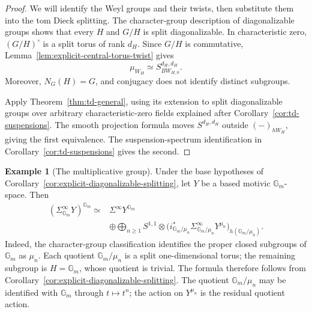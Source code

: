 \documentclass[11pt,reqno]{amsart}
\theoremstyle{definition}
\newtheorem{example}[theorem]{Example}
\theoremstyle{remark}
\theoremstyle{plain}
\numberwithin{equation}{section}
\newcommand{\Gm}{\mathbb G_m}
\begin{document}
\begin{proof}
We will identify the Weyl groups and their twists,
then substitute them into the tom Dieck splitting.
The character-group description of diagonalizable groups
\cite[Theorem~12.9]{MilneAG} shows that every \(H\) and
\(G/H\) is split diagonalizable. In characteristic zero,
\((G/H)^\circ\) is a split torus of rank \(d_H\).
Since \(G/H\) is commutative,
Lemma~\ref{lem:explicit-central-torus-twist} gives
\[
 \mu_{W_H}\simeq S^{d_H,d_H}_{BW_{H,S}}.
\]
Moreover, \(N_G(H)=G\), and conjugacy does not identify
distinct subgroups.

Apply Theorem~\ref{thm:td-general}, using its extension to
split diagonalizable groups over arbitrary
characteristic-zero fields explained after
Corollary~\ref{cor:td-suspensions}. The smooth projection
formula moves \(S^{d_H,d_H}\) outside \((-)_{hW_H}\),
giving the first equivalence. The suspension-spectrum
identification in Corollary~\ref{cor:td-suspensions}
gives the second.
\end{proof}

\begin{example}[The multiplicative group]
\label{ex:explicit-gm-splitting}
Under the base hypotheses of
Corollary~\ref{cor:explicit-diagonalizable-splitting}, let
\(Y\) be a based motivic \(\Gm\)-space. Then
\[
 \begin{aligned}
 (\Sigma_{\Gm}^\infty Y)^{\Gm}
 \simeq{}&\Sigma^\infty Y^{\Gm}\\
 &\oplus\bigoplus_{n\geq1}S^{1,1}\otimes
 \bigl(i_{\Gm/\mu_n}^*
       \Sigma_{\Gm/\mu_n}^\infty Y^{\mu_n}\bigr)
       _{h(\Gm/\mu_n)}.
 \end{aligned}
\]
Indeed, the character-group classification
\cite[Theorem~12.9]{MilneAG} identifies the proper closed
subgroups of \(\Gm\) as \(\mu_n\). Each quotient \(\Gm/\mu_n\) is a split
one-dimensional torus; the remaining subgroup is
\(H=\Gm\), whose quotient is trivial.
The formula therefore follows from
Corollary~\ref{cor:explicit-diagonalizable-splitting}.
The quotient \(\Gm/\mu_n\) may be identified with \(\Gm\)
through \(t\mapsto t^n\); the action on \(Y^{\mu_n}\)
is the residual quotient action.
\end{example}
\end{document}
